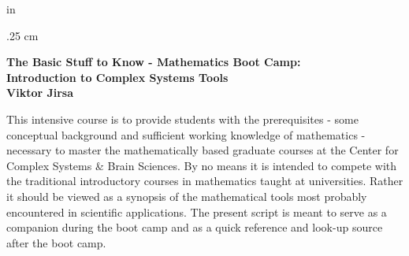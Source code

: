 \documentclass[11pt]{article}
\begin{document}
\def\thcr{\cr\noalign{\vskip.3cm}}

\newlength{\eqbreite}\setlength{\eqbreite}{\textwidth}

\addtolength{\eqbreite}{-1.5cm}



\long\def\bnn#1\enn{$$\begin{minipage}{\eqbreite}

\vskip .1cm \let\\ = \thcr \halign{$\displaystyle{##}$

\hfil && $\displaystyle{##}$\hfil \cr#1 \cr}

\vskip.3cm \end{minipage}$$}



 in

\parskip .25 cm












\thispagestyle{empty}

\svs

\begin{center}

\LARGE \textrm{\textbf{The Basic Stuff to Know - Mathematics Boot Camp: \\
 Introduction to Complex Systems Tools}}\\

\vspace*{1cm}  {\bf Viktor Jirsa} \\

\end{center} \vs



\normalsize
This intensive course is to provide students with the
prerequisites - some conceptual background and sufficient working
knowledge of mathematics - necessary to master the mathematically
based graduate courses at the Center for Complex Systems \& Brain
Sciences. By no means it is intended to compete with the
traditional introductory courses in mathematics taught at
universities. Rather it should be viewed as a synopsis of the
mathematical tools most probably encountered in scientific
applications. The present script is meant to serve as a companion
during the boot camp and as a quick reference and look-up source
after the boot camp.
\vs \svs
\end{document}
